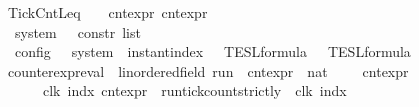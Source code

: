 \begin{isabellebody}
{\isacharbar}\ TickCntLeq\ \ \ \ {\isacartoucheopen}cnt{\isacharunderscore}expr{\isacartoucheclose}\ {\isacartoucheopen}cnt{\isacharunderscore}expr{\isacartoucheclose}\ \ \ \ \ \ \ \ \ \ \ \ \ \ \ \ \ \ \ \ \ \ \ \ \ \ \ \ {\isacharparenleft}{\isachardoublequoteopen}{\isacharunderscore}\ {\isasympreceq}\ {\isacharunderscore}{\isachardoublequoteclose}{\isacharparenright}\isanewline
\isanewline
{}\isamarkupfalse%
\ {\isacharprime}{\isasymtau}\ system\ {\isacharequal}\ {\isacartoucheopen}{\isacharprime}{\isasymtau}\ constr\ list{\isacartoucheclose}\isanewline
\isanewline
\isanewline
%
\isanewline
{}\isamarkupfalse%
\ {\isacharprime}{\isasymtau}\ config\ {\isacharequal}\ {\isacartoucheopen}{\isacharprime}{\isasymtau}\ system\ {\isacharasterisk}\ instant{\isacharunderscore}index\ {\isacharasterisk}\ {\isacharprime}{\isasymtau}\ TESL{\isacharunderscore}formula\ {\isacharasterisk}\ {\isacharprime}{\isasymtau}\ TESL{\isacharunderscore}formula{\isacartoucheclose}%
\isadelimdocument
%
\endisadelimdocument
%
\isatagdocument
%
\isamarkuptrue%
%
\endisatagdocument
{\isafolddocument}%
%
\isadelimdocument
%
\endisadelimdocument
{}\isamarkupfalse%
\ counter{\isacharunderscore}expr{\isacharunderscore}eval\ {\isacharcolon}{\isacharcolon}\ {\isacartoucheopen}{\isacharparenleft}{\isacharprime}{\isasymtau}{\isacharcolon}{\isacharcolon}linordered{\isacharunderscore}field{\isacharparenright}\ run\ {\isasymRightarrow}\ cnt{\isacharunderscore}expr\ {\isasymRightarrow}\ nat{\isacartoucheclose}\ {\isacharparenleft}{\isachardoublequoteopen}{\isasymlbrakk}\ {\isacharunderscore}\ {\isasymturnstile}\ {\isacharunderscore}\ {\isasymrbrakk}\isactrlsub c\isactrlsub n\isactrlsub t\isactrlsub e\isactrlsub x\isactrlsub p\isactrlsub r{\isachardoublequoteclose}{\isacharparenright}\isanewline
{}\isanewline
\ \ {\isacartoucheopen}{\isasymlbrakk}\ {\isasymrho}\ {\isasymturnstile}\ {\isacharhash}\isactrlsup {\isacharless}\ clk\ indx\ {\isasymrbrakk}\isactrlsub c\isactrlsub n\isactrlsub t\isactrlsub e\isactrlsub x\isactrlsub p\isactrlsub r\ {\isacharequal}\ run{\isacharunderscore}tick{\isacharunderscore}count{\isacharunderscore}strictly\ {\isasymrho}\ clk\ indx{\isacartoucheclose}\isanewline

\end{isabellebody}
